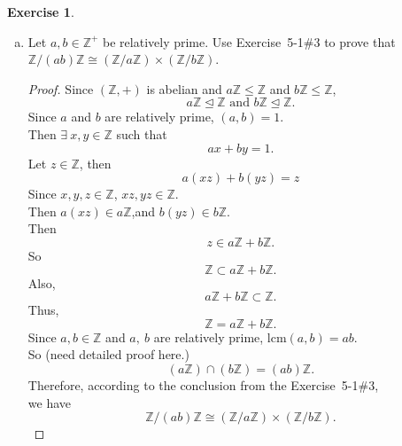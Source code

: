 \documentclass{article}
\newcommand{\bbz}{\mathbb{Z}}
\theoremstyle{plain}
\theoremstyle{definition}
\newtheorem{exer}[lem]{Exercise}
\begin{document}
\begin{exer}
\begin{enumerate}[(a)]
\item Let $a,b\in\bbz^+$ be relatively prime. Use Exercise~5-1\#3
to prove that $\bbz/(ab)\bbz\cong(\bbz/a\bbz)\times(\bbz/b\bbz)$.
\begin{proof}
 	 Since $(\bbz, +)$ is abelian and $a\bbz \leq \bbz$ and $b\bbz \leq \bbz$,
	 \[a\bbz \unlhd \bbz \text{ and } b\bbz \unlhd \bbz.\]
	 Since $a$ and $b$ are relatively prime, $(a,b) = 1$.\\
	 Then $\exists \ x,y\in \bbz$ such that
	 \[ax+by = 1.\]
	 Let $z \in \bbz$, then 
	 \[a(xz) + b(yz) = z\]
	 Since $x,y,z\in\bbz$, $xz,yz \in \bbz$.\\
	 Then 
	 $a(xz) \in a\bbz$,and $b(yz) \in b\bbz$.\\
	 Then 
	 \[z \in a\bbz + b\bbz.\]
	 So
	 \[\bbz \subset a\bbz + b\bbz.\]
	 Also, 
	 \[ a\bbz + b\bbz \subset \bbz.\]
	 Thus,
	 \[\bbz = a\bbz + b\bbz.\]	
	 Since $a,b \in \bbz$ and $a,~b$ are relatively prime, $\text{lcm}(a,b) = ab$.\\
	 So (need detailed proof here.)
	 \[(a\bbz)\cap (b\bbz) = (ab)\bbz.\]
	 Therefore, according to the conclusion from the Exercise~5-1\#3, \\
	 we have
	 \[\bbz/(ab)\bbz\cong(\bbz/a\bbz)\times(\bbz/b\bbz).\]
\end{proof}


\end{enumerate}
\end{exer}
\end{document}
